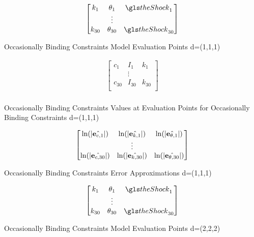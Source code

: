 \documentclass[12pt]{article}
\begin{document}
 \begin{table}
   \centering
  
 \begin{gather*}
   \begin{bmatrix}
     k_1&\theta_1&\theShock_1\\
 &\vdots\\
     k_{30}&\theta_{30}&\theShock_{30}\\
   \end{bmatrix}\\
%  
 \end{gather*}

   \caption{Occasionally Binding Constraints Model Evaluation Points \label{evalpobcA} d=(1,1,1)}
 \end{table}


\begin{table}
  \centering
  
\begin{gather*}
  \begin{bmatrix}
    c_1&I_1&k_1\\
&\vdots\\
    c_{30}&I_{30}&k_{30}\\
  \end{bmatrix}\\
% 
\end{gather*}

  \caption{Occasionally Binding Constraints Values at Evaluation Points for Occasionally Binding Constraints \label{valatobcA}  d=(1,1,1)}
\end{table}

 \begin{table}
   \centering
  
   \begin{gather*}
\forEstErr\\
%   
   \end{gather*}
   \caption{Occasionally Binding Constraints Error Approximations\label{esterrobcA}  d=(1,1,1)}
 \end{table}





 \begin{table}
   \centering
  
 \begin{gather*}
   \begin{bmatrix}
     k_1&\theta_1&\theShock_1\\
 &\vdots\\
     k_{30}&\theta_{30}&\theShock_{30}\\
   \end{bmatrix}\\
%  
 \end{gather*}

   \caption{Occasionally Binding Constraints Model Evaluation Points \label{evalpobcB} d=(2,2,2)}
 \end{table}
\end{document}
